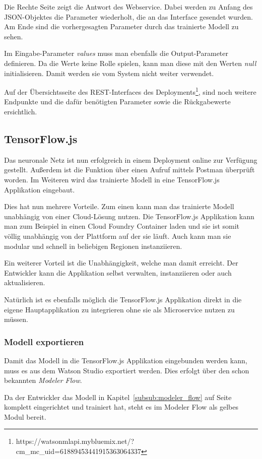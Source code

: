 Die Rechte Seite zeigt die Antwort des Webservice. Dabei werden zu Anfang des JSON-Objektes die Parameter wiederholt,
die an das Interface gesendet wurden. Am Ende sind die vorhergesagten Parameter durch das trainierte Modell zu sehen.

Im Eingabe-Parameter \textit{values} muss man ebenfalls die Output-Parameter definieren. Da die Werte keine Rolle
spielen, kann man diese mit den Werten \textit{null} initialisieren. Damit werden sie vom System nicht weiter verwendet.

Auf der Übersichtsseite des REST-Interfaces des
Deployments\footnote{https://watson\-ml\-api.mybluemix.net/?cm\_mc\_uid=61889453441915363064337}, sind noch weitere
Endpunkte und die dafür benötigten Parameter sowie die Rückgabewerte ersichtlich.

\subsection{TensorFlow.js}
Das neuronale Netz ist nun erfolgreich in einem Deployment online zur Verfügung gestellt. Außerdem ist die Funktion
über einen Aufruf mittels Postman überprüft worden. Im Weiteren wird das trainierte Modell in eine TensorFlow.js
Applikation eingebaut.

Dies hat nun mehrere Vorteile. Zum einen kann man das trainierte Modell unabhängig von einer Cloud-Lösung nutzen. Die
TensorFlow.js Applikation kann man zum Beispiel in einen Cloud Foundry Container laden und sie ist somit völlig
unabhängig von der Plattform auf der sie läuft. Auch kann man sie modular und schnell in beliebigen Regionen
instanziieren.

Ein weiterer Vorteil ist die Unabhängigkeit, welche man damit erreicht. Der Entwickler kann die Applikation selbst
verwalten, instanziieren oder auch aktualisieren.

Natürlich ist es ebenfalls möglich die TensorFlow.js Applikation direkt in die eigene Hauptapplikation zu integrieren
ohne sie als Microservice nutzen zu müssen.

\subsubsection{Modell exportieren}
Damit das Modell in die TensorFlow.js Applikation eingebunden werden kann, muss es aus dem Watson Studio exportiert
werden. Dies erfolgt über den schon bekannten \textit{Modeler Flow}.

Da der Entwickler das Modell in Kapitel~\ref{subsub:modeler_flow} auf Seite~\pageref{subsub:modeler_flow} komplett
eingerichtet und trainiert hat, steht es im Modeler Flow als gelbes Modul bereit.

